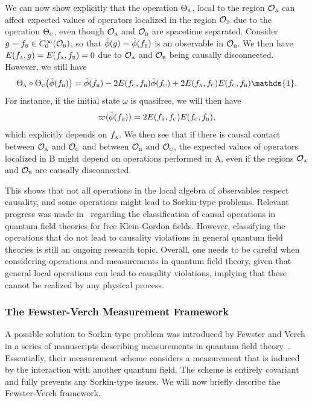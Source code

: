 \documentclass[letterpaper,12pt,titlepage,oneside,final]{book}
\newcommand{\openone}{\mathds{1}}
\newcommand{\tc}[1]{\textsc{#1}}
\begin{document}
We can now show explicitly that the operation $\Theta_\tc{a}$, local to the region $\mathcal{O}_\tc{a}$ can affect expected values of operators localized in the region $\mathcal{O}_\tc{b}$ due to the operation $\Theta_\tc{c}$, even though $\mathcal{O}_\tc{a}$ and $\mathcal{O}_\tc{b}$ are spacetime separated. Consider $g = f_\tc{b}\in C_0^\infty(\mathcal{O}_\tc{b})$, so that $\hat{\phi}(g) = \hat{\phi}(f_\tc{b})$ is an observable in $\mathcal{O}_\tc{b}$. We then have $E(f_\tc{a},g) = E(f_\tc{a},f_\tc{b}) = 0$ due to $\mathcal{O}_\tc{a}$ and $\mathcal{O}_\tc{b}$ being causally disconnected. However, we still have
\begin{equation}
    \Theta_\tc{a}\circ\Theta_\tc{c}\big(\hat{\phi}(f_\tc{b})\big) = \hat{\phi}(f_\tc{b}) - 2 E(f_\tc{c},f_\tc{b})\hat{\phi}(f_\tc{c}) + 2 E(f_\tc{a},f_\tc{c})E(f_\tc{c},f_\tc{b})\openone.
\end{equation}
For instance, if the initial state $\omega$ is quasifree, we will then have 
\begin{equation}
    \varpi(\hat{\phi}(f_\tc{b})) = 2 E(f_\tc{a},f_\tc{c})E(f_\tc{c},f_\tc{b}),
\end{equation}
which explicitly depends on $f_\tc{a}$. We then see that if there is causal contact between $\mathcal{O}_\tc{a}$ and $\mathcal{O}_\tc{c}$ and between $\mathcal{O}_\tc{b}$ and $\mathcal{O}_\tc{c}$, the expected values of operators localized in B might depend on operations performed in A, even if the regions $\mathcal{O}_\tc{a}$ and $\mathcal{O}_\tc{b}$ are causally disconnected.

This shows that not all operations in the local algebra of observables respect causality, and some operations might lead to Sorkin-type problems. Relevant progress was made in~\cite{IanJubb} regarding the classification of causal operations in quantum field theories for free Klein-Gordon fields. However, classifying the operations that do not lead to causality violations in general quantum field theories is still an ongoing research topic. Overall, one needs to be careful when considering operations and measurements in quantum field theory, given that general local operations can lead to causality violations, implying that these cannot be realized by any physical process.


\subsubsection*{The Fewster-Verch Measurement Framework}

A possible solution to Sorkin-type problem was introduced by Fewster and Verch in a series of manuscripts describing measurements in quantum field theory~\cite{FVOG,FVGenerallyCovariant2020,FVall2023,FV2024}. Essentially, their measurement scheme considers a measurement that is induced by the interaction with another quantum field. The scheme is entirely covariant and fully prevents any Sorkin-type issues. We will now briefly describe the Fewster-Verch framework.
\end{document}
